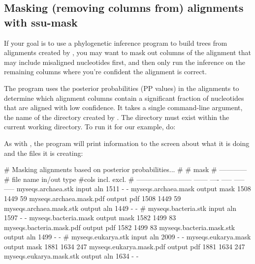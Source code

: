 \subsection{Masking (removing columns from) alignments with ssu-mask}

If your goal is to use a phylogenetic inference program to build trees
from alignments created by , you may want to mask
out columns of the alignment that may include misaligned nucleotides
first, and then only run the inference on the remaining columns where
you're confident the alignment is correct. 

The  program uses the posterior probabilities
(PP values) in the alignments to determine which alignment columns
contain a significant fraction of nucleotides that are aligned with
low confidence. It takes a single command-line argument, the name of
the directory created by . The directory must exist
within the current working directory. To run it for our example, do: 


As with , the program will print information to the
screen about what it is doing and the files it is creating:

\begin{sreoutput}
# Masking alignments based on posterior probabilities...
#
#                                                    mask    
#                                                ------------
# file name                 in/out  type  #cols  incl.  excl.
# ------------------------  ------  ----  -----  -----  -----
  myseqs.archaea.stk         input   aln   1511      -      -
  myseqs.archaea.mask       output  mask   1508   1449     59
  myseqs.archaea.mask.pdf   output   pdf   1508   1449     59
  myseqs.archaea.mask.stk   output   aln   1449      -      -
#
  myseqs.bacteria.stk        input   aln   1597      -      -
  myseqs.bacteria.mask      output  mask   1582   1499     83
  myseqs.bacteria.mask.pdf  output   pdf   1582   1499     83
  myseqs.bacteria.mask.stk  output   aln   1499      -      -
#
  myseqs.eukarya.stk         input   aln   2009      -      -
  myseqs.eukarya.mask       output  mask   1881   1634    247
  myseqs.eukarya.mask.pdf   output   pdf   1881   1634    247
  myseqs.eukarya.mask.stk   output   aln   1634      -      -
\end{sreoutput}

